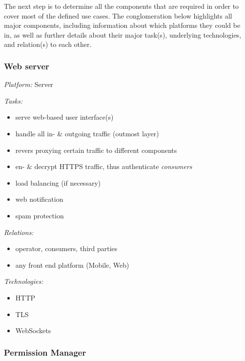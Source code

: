 \documentclass[12pt,english,a4paper,titlepage,cleardoublepage=empty,dottedtoc]{report}
\providecommand{\tightlist}{%
  \setlength{\itemsep}{0pt}\setlength{\parskip}{0pt}}
\begin{document}
The next step is to determine all the components that are required in
order to cover most of the defined use cases. The conglomeration below
highlights all major components, including information about which
platforms they could be in, as well as further details about their major
task(s), underlying technologies, and relation(s) to each other.

\subsubsection*{Web server}\label{web-server}

\emph{Platform:} Server

\emph{Tasks:}

\begin{itemize}
\tightlist
\item
  serve web-based user interface(s)
\item
  handle all in- \& outgoing traffic (outmost layer)
\item
  revers proxying certain traffic to different components
\item
  en- \& decrypt HTTPS traffic, thus authenticate \emph{consumers}
\item
  load balancing (if necessary)
\item
  web notification
\item
  spam protection
\end{itemize}

\emph{Relations:}

\begin{itemize}
\tightlist
\item
  operator, consumers, third parties
\item
  any front end platform (Mobile, Web)
\end{itemize}

\emph{Technologies:}

\begin{itemize}
\tightlist
\item
  HTTP
\item
  TLS
\item
  WebSockets
\end{itemize}

\subsubsection*{Permission Manager}\label{permission-manager}
\end{document}
